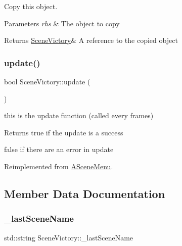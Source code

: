 Copy this object. 


\begin{DoxyParams}{Parameters}
{\em rhs} & The object to copy \\
\hline
\end{DoxyParams}
\begin{DoxyReturn}{Returns}
\hyperlink{class_scene_victory}{Scene\+Victory}\& A reference to the copied object 
\end{DoxyReturn}
\mbox{\label{class_scene_victory_aea51a7b48a3243175e1759b20f853c16}} 
\subsubsection{\texorpdfstring{update()}{update()}}
{\footnotesize\ttfamily bool Scene\+Victory\+::update (\begin{DoxyParamCaption}{ }\end{DoxyParamCaption})\hspace{0.3cm}{\ttfamily [virtual]}}



this is the update function (called every frames) 

\begin{DoxyReturn}{Returns}
true if the update is a success 

false if there are an error in update 
\end{DoxyReturn}


Reimplemented from \hyperlink{class_a_scene_menu_a1deeb5fd9be97376998cd2af36f29744}{A\+Scene\+Menu}.



\subsection{Member Data Documentation}
\mbox{\label{class_scene_victory_a72a7535197c55d7e16d70d0beb8641e2}} 
\subsubsection{\texorpdfstring{\+\_\+last\+Scene\+Name}{\_lastSceneName}}
{\footnotesize\ttfamily std\+::string Scene\+Victory\+::\+\_\+last\+Scene\+Name\hspace{0.3cm}{\ttfamily [protected]}}

